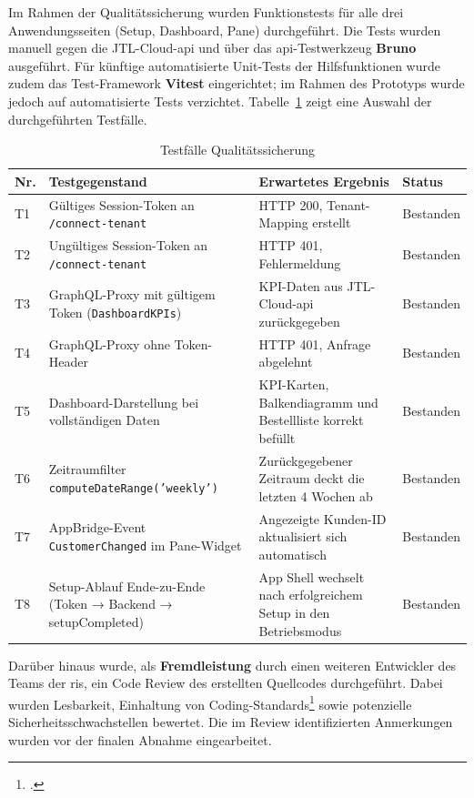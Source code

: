 \documentclass[11pt, a4paper, oneside]{report}
\begin{document}
Im Rahmen der Qualitätssicherung wurden Funktionstests für alle drei
Anwendungsseiten (Setup, Dashboard, Pane) durchgeführt. Die Tests wurden
manuell gegen die JTL-Cloud-\gls{api} und über das \gls{api}-Testwerkzeug \textbf{Bruno}
ausgeführt. Für künftige automatisierte Unit-Tests der Hilfsfunktionen wurde zudem das
Test-Framework \textbf{Vitest} eingerichtet; im Rahmen des Prototyps wurde jedoch auf
automatisierte Tests verzichtet.
Tabelle~\ref{tab:testfaelle} zeigt eine Auswahl der durchgeführten Testfälle.

\begin{table}[H]
  \centering
  \caption{Testfälle Qualitätssicherung}
  \label{tab:testfaelle}
  \begin{tabularx}{\textwidth}{l X X l}
    \toprule
    \textbf{Nr.} & \textbf{Testgegenstand} & \textbf{Erwartetes Ergebnis} & \textbf{Status} \\
    \midrule
    T1 & Gültiges Session-Token an \texttt{/connect-tenant}
       & HTTP 200, Tenant-Mapping erstellt
       & Bestanden \\
    T2 & Ungültiges Session-Token an \texttt{/connect-tenant}
       & HTTP 401, Fehlermeldung
       & Bestanden \\
    T3 & GraphQL-Proxy mit gültigem Token (\texttt{DashboardKPIs})
       & KPI-Daten aus JTL-Cloud-\gls{api} zurückgegeben
       & Bestanden \\
    T4 & GraphQL-Proxy ohne Token-Header
       & HTTP 401, Anfrage abgelehnt
       & Bestanden \\
    T5 & Dashboard-Darstellung bei vollständigen Daten
       & KPI-Karten, Balkendiagramm und Bestellliste korrekt befüllt
       & Bestanden \\
    T6 & Zeitraumfilter \texttt{computeDateRange('weekly')}
       & Zurückgegebener Zeitraum deckt die letzten 4 Wochen ab
       & Bestanden \\
    T7 & AppBridge-Event \texttt{CustomerChanged} im Pane-Widget
       & Angezeigte Kunden-ID aktualisiert sich automatisch
       & Bestanden \\
    T8 & Setup-Ablauf Ende-zu-Ende (Token → Backend → setupCompleted)
       & App Shell wechselt nach erfolgreichem Setup in den Betriebsmodus
       & Bestanden \\
    \bottomrule
  \end{tabularx}
\end{table}

Darüber hinaus wurde, als \textbf{Fremdleistung} durch einen weiteren Entwickler
des Teams der \gls{ris}, ein Code Review des erstellten Quellcodes durchgeführt.
Dabei wurden Lesbarkeit, Einhaltung von Coding-Standards\footcite{clean_code} sowie potenzielle
Sicherheitsschwachstellen bewertet. Die im Review identifizierten Anmerkungen wurden
vor der finalen Abnahme eingearbeitet.
\end{document}
